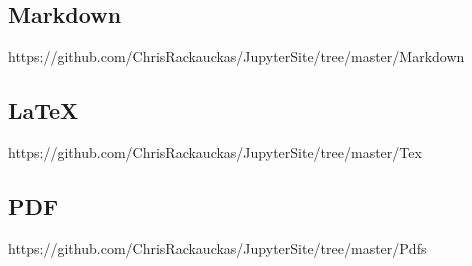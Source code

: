 \documentclass[11pt]{article}
\begin{document}
\subsection{Markdown}\label{markdown}

https://github.com/ChrisRackauckas/JupyterSite/tree/master/Markdown

\subsection{LaTeX}\label{latex}

https://github.com/ChrisRackauckas/JupyterSite/tree/master/Tex

\subsection{PDF}\label{pdf}

https://github.com/ChrisRackauckas/JupyterSite/tree/master/Pdfs


    
    
    
    
\end{document}

